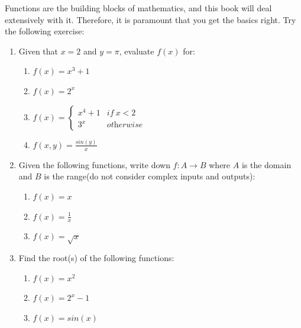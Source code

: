   Functions are the building blocks of mathematics, and this book will deal extensively with it. Therefore, it is paramount that you get the basics right. Try the following exercise:
  \begin{Exercise}
    \begin{enumerate}
    \item{Given that \(x=2\) and \(y=\pi\), evaluate \(f(x)\) for:
    \begin{enumerate}
      \item{\(f(x)=x^3+1\)}
      \item{\(f(x)=2^x\)}
      \item{\(f(x)= \begin{cases}
            x^4+1 & \textit{if} \ x<2 \\
            3^x & \textit{otherwise}
      \end{cases}\)}
    \item{\(f(x,y)=\frac{sin(y)}{x}\)}
    \end{enumerate}} 
  \item{Given the following functions, write down \(f:A \to B\) where \(A\) is the domain and \(B\) is the range(do not consider complex inputs and outputs):
      \begin{enumerate}
        \item{\(f(x)=x\) }
        \item{\(f(x)=\frac{1}{x}\)}
        \item{\(f(x)=\sqrt{x}\)}
      \end{enumerate}
    }
  \item{Find the root(s) of the following functions:
      \begin{enumerate}
        \item{\(f(x)=x^2\)} 
        \item{\(f(x)=2^x-1\)}
        \item{\(f(x)=sin(x)\)}
      \end{enumerate}
    }
  \end{enumerate}
  \end{Exercise}
